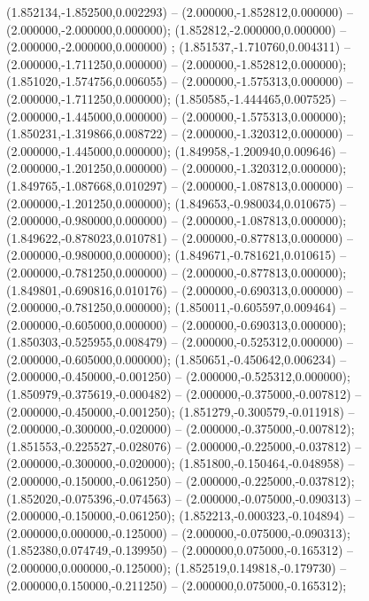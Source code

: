  (1.852134,-1.852500,0.002293) -- (2.000000,-1.852812,0.000000) -- (2.000000,-2.000000,0.000000);
 (1.852812,-2.000000,0.000000) -- (2.000000,-2.000000,0.000000) ;
 (1.851537,-1.710760,0.004311) -- (2.000000,-1.711250,0.000000) -- (2.000000,-1.852812,0.000000);
 (1.851020,-1.574756,0.006055) -- (2.000000,-1.575313,0.000000) -- (2.000000,-1.711250,0.000000);
 (1.850585,-1.444465,0.007525) -- (2.000000,-1.445000,0.000000) -- (2.000000,-1.575313,0.000000);
 (1.850231,-1.319866,0.008722) -- (2.000000,-1.320312,0.000000) -- (2.000000,-1.445000,0.000000);
 (1.849958,-1.200940,0.009646) -- (2.000000,-1.201250,0.000000) -- (2.000000,-1.320312,0.000000);
 (1.849765,-1.087668,0.010297) -- (2.000000,-1.087813,0.000000) -- (2.000000,-1.201250,0.000000);
 (1.849653,-0.980034,0.010675) -- (2.000000,-0.980000,0.000000) -- (2.000000,-1.087813,0.000000);
 (1.849622,-0.878023,0.010781) -- (2.000000,-0.877813,0.000000) -- (2.000000,-0.980000,0.000000);
 (1.849671,-0.781621,0.010615) -- (2.000000,-0.781250,0.000000) -- (2.000000,-0.877813,0.000000);
 (1.849801,-0.690816,0.010176) -- (2.000000,-0.690313,0.000000) -- (2.000000,-0.781250,0.000000);
 (1.850011,-0.605597,0.009464) -- (2.000000,-0.605000,0.000000) -- (2.000000,-0.690313,0.000000);
 (1.850303,-0.525955,0.008479) -- (2.000000,-0.525312,0.000000) -- (2.000000,-0.605000,0.000000);
 (1.850651,-0.450642,0.006234) -- (2.000000,-0.450000,-0.001250) -- (2.000000,-0.525312,0.000000);
 (1.850979,-0.375619,-0.000482) -- (2.000000,-0.375000,-0.007812) -- (2.000000,-0.450000,-0.001250);
 (1.851279,-0.300579,-0.011918) -- (2.000000,-0.300000,-0.020000) -- (2.000000,-0.375000,-0.007812);
 (1.851553,-0.225527,-0.028076) -- (2.000000,-0.225000,-0.037812) -- (2.000000,-0.300000,-0.020000);
 (1.851800,-0.150464,-0.048958) -- (2.000000,-0.150000,-0.061250) -- (2.000000,-0.225000,-0.037812);
 (1.852020,-0.075396,-0.074563) -- (2.000000,-0.075000,-0.090313) -- (2.000000,-0.150000,-0.061250);
 (1.852213,-0.000323,-0.104894) -- (2.000000,0.000000,-0.125000) -- (2.000000,-0.075000,-0.090313);
 (1.852380,0.074749,-0.139950) -- (2.000000,0.075000,-0.165312) -- (2.000000,0.000000,-0.125000);
 (1.852519,0.149818,-0.179730) -- (2.000000,0.150000,-0.211250) -- (2.000000,0.075000,-0.165312);
